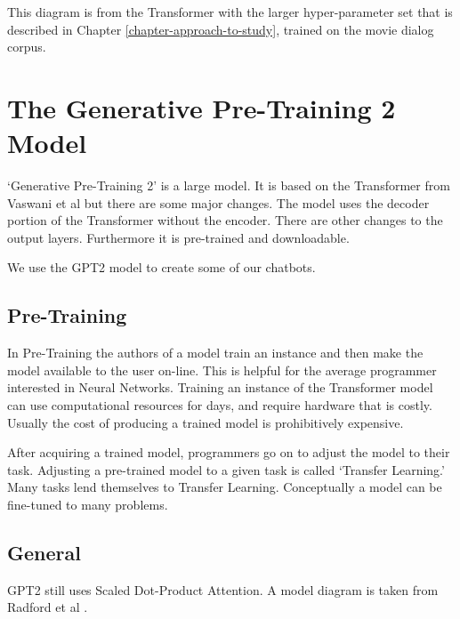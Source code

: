 This diagram is from the Transformer with the larger hyper-parameter set that is described in Chapter \ref{chapter-approach-to-study}, trained on the movie dialog corpus.


\section{The Generative Pre-Training 2 Model}

`Generative Pre-Training 2' is a large model. It is based on the Transformer from Vaswani et al \cite{Vaswani2017AttentionIA} but there are some major changes. The model uses the decoder portion of the Transformer without the encoder. There are other changes to the output layers. Furthermore it is pre-trained and downloadable.

We use the GPT2 model to create some of our chatbots.


\subsection{Pre-Training}
In Pre-Training the authors of a model train an instance and then make the model available to the user on-line. This is helpful for the average programmer interested in Neural Networks. Training an instance of the Transformer model can use computational resources for days, and require hardware that is costly. Usually the cost of producing a trained model is prohibitively expensive.

After acquiring a trained model, programmers go on to adjust the model to their task. Adjusting a pre-trained model to a given task is called `Transfer Learning.' Many tasks lend themselves to Transfer Learning. Conceptually a model can be fine-tuned to many problems. %


\subsection{General}
\ac{GPT2} still uses Scaled Dot-Product Attention. A model diagram is taken from Radford et al \cite{radford2018improving}. 

